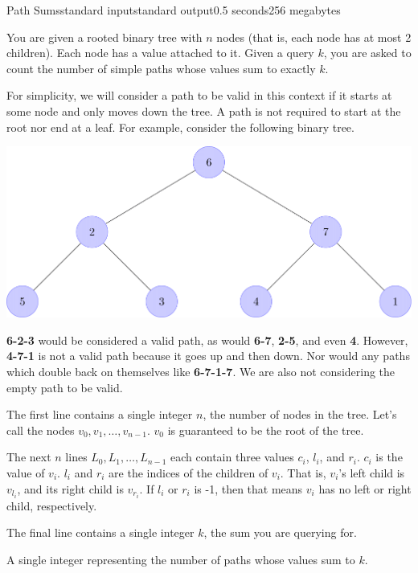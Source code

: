 \begin{problem}{Path Sums}{standard input}{standard output}{0.5 seconds}{256 megabytes}

You are given a rooted binary tree with $n$ nodes (that is, each node has at most 2 children). Each node has a value attached to it. Given a query $k$, you are asked to count the number of simple paths whose values sum to exactly $k$.

For simplicity, we will consider a path to be valid in this context if it starts at some node and only moves down the tree. A path is not required to start at the root nor end at a leaf. For example, consider the following binary tree.

\begin{center}
\includegraphics{example_binary_tree.png}
\end{center}

\textbf{6-2-3} would be considered a valid path, as would \textbf{6-7}, \textbf{2-5}, and even \textbf{4}. However, \textbf{4-7-1} is not a valid path because it goes up and then down. Nor would any paths which double back on themselves like \textbf{6-7-1-7}. We are also not considering the empty path to be valid.

\InputFile
The first line contains a single integer $n$, the number of nodes in the tree. Let's call the nodes $v_0, v_1, \dots, v_{n-1}$. $v_0$ is guaranteed to be the root of the tree.

The next $n$ lines $L_0, L_1, \dots, L_{n-1}$ each contain three values $c_i$, $l_i$, and $r_i$. $c_i$ is the value of $v_i$. $l_i$ and $r_i$ are the indices of the children of $v_i$. That is, $v_i$'s left child is $v_{l_i}$, and its right child is $v_{r_i}$. If $l_i$ or $r_i$ is -1, then that means $v_i$ has no left or right child, respectively.

The final line contains a single integer $k$, the sum you are querying for.

\OutputFile
A single integer representing the number of paths whose values sum to $k$.


\end{problem}
